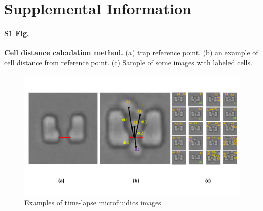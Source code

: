\documentclass[conference]{IEEEtran}
\begin{document}
 








\section{Supplemental Information}

\paragraph*{S1 Fig.}
\label{S1_Fig}
{\bf  Cell distance calculation method.} (a) trap reference point. (b) an example of cell distance from reference point. (c) Sample of some images with labeled cells. 


\begin{figure}
\centering
\includegraphics[width=\textwidth,height=10 cm]{Patterns/point.pdf}
\caption{ Examples of time-lapse microfluidics images.}
\label{fig:imageData}
\end{figure} 
\end{document}
